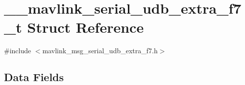 \hypertarget{struct____mavlink__serial__udb__extra__f7__t}{\section{\+\_\+\+\_\+mavlink\+\_\+serial\+\_\+udb\+\_\+extra\+\_\+f7\+\_\+t Struct Reference}
\label{struct____mavlink__serial__udb__extra__f7__t}
}


{\ttfamily \#include $<$mavlink\+\_\+msg\+\_\+serial\+\_\+udb\+\_\+extra\+\_\+f7.\+h$>$}

\subsection*{Data Fields}
